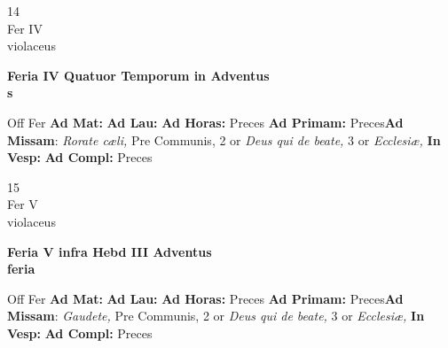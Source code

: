 \documentclass[10pt, openany]{book}
\begin{document}
        \begin{center}
            \begin{minipage}{3.5in}
                \vspace{2em}
                \begin{minipage}{0.5in}
                    {\Huge 14} \\
                    {\normalsize Fer IV} \\
                    {\normalsize violaceus}
                \end{minipage}
                \begin{minipage}{3.0in}
                    \textbf{ \large Feria IV Quatuor Temporum in Adventus \\
                    \textnormal{\normalsize s}} \\ 
                \end{minipage}
                \begin{justify}Off Fer
                    \textbf{Ad Mat: }
                    \textbf{Ad Lau: }
                    \textbf{Ad Horas: }Preces
                    \textbf{Ad Primam: }Preces\textbf{Ad Missam}: \textit{Rorate cæli,} Pre Communis, 2 or \textit{Deus qui de beate,} 3 or \textit{Ecclesiæ,}  
                    \textbf{In Vesp: }
                    \textbf{Ad Compl: }Preces
                \end{justify}
            \end{minipage}
        \end{center}
    
        \begin{center}
            \begin{minipage}{3.5in}
                \vspace{2em}
                \begin{minipage}{0.5in}
                    {\Huge 15} \\
                    {\normalsize Fer V} \\
                    {\normalsize violaceus}
                \end{minipage}
                \begin{minipage}{3.0in}
                    \textbf{ \large Feria V infra Hebd III Adventus \\
                    \textnormal{\normalsize feria}} \\ 
                \end{minipage}
                \begin{justify}Off Fer
                    \textbf{Ad Mat: }
                    \textbf{Ad Lau: }
                    \textbf{Ad Horas: }Preces
                    \textbf{Ad Primam: }Preces\textbf{Ad Missam}: \textit{Gaudete,} Pre Communis, 2 or \textit{Deus qui de beate,} 3 or \textit{Ecclesiæ,}  
                    \textbf{In Vesp: }
                    \textbf{Ad Compl: }Preces
                \end{justify}
            \end{minipage}
        \end{center}
    
\end{document}
